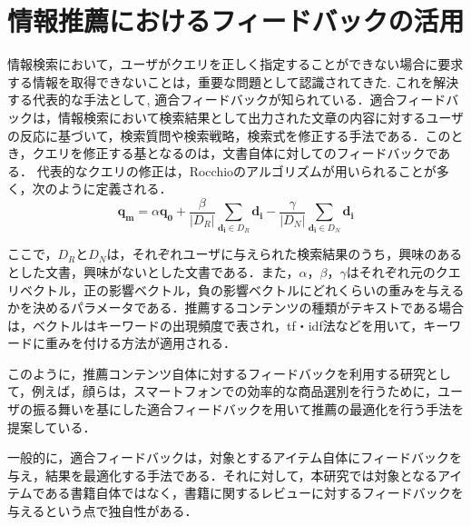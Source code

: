 \documentclass[a4paper,11pt,oneside,openany]{jsbook}
\begin{document}
	\section{情報推薦におけるフィードバックの活用}
\label{sec:related_feed}
情報検索において，ユーザがクエリを正しく指定することができない場合に要求する情報を取得できないことは，重要な問題として認識されてきた. これを解決する代表的な手法として, 適合フィードバックが知られている\cite{feedback}．適合フィードバックは，情報検索において検索結果として出力された文章の内容に対するユーザの反応に基づいて，検索質問や検索戦略，検索式を修正する手法である\cite{hijikata}．このとき，クエリを修正する基となるのは，文書自体に対してのフィードバックである．
代表的なクエリの修正は，Rocchioのアルゴリズムが用いられることが多く，次のように定義される．
\begin{equation}
\mathbf{q_m} = \alpha\mathbf{q_0}+\frac{\beta}{|D_R|}\sum_{\mathbf{d_i}\in{D_R}}{\mathbf{d_i}}-\frac{\gamma}{|D_N|}\sum_{\mathbf{d_i}\in{D_N}}{\mathbf{d_i}}
\end{equation}
\par
ここで，$D_R$と$D_N$は，それぞれユーザに与えられた検索結果のうち，興味のあるとした文書，興味がないとした文書である．また，$\alpha$，$\beta$，$\gamma$はそれぞれ元のクエリベクトル，正の影響ベクトル，負の影響ベクトルにどれくらいの重みを与えるかを決めるパラメータである．推薦するコンテンツの種類がテキストである場合は，ベクトルはキーワードの出現頻度で表され，tf・idf法などを用いて，キーワードに重みを付ける方法が適用される．
\par
このように，推薦コンテンツ自体に対するフィードバックを利用する研究として，例えば，顔らは，スマートフォンでの効率的な商品選別を行うために，ユーザの振る舞いを基にした適合フィードバックを用いて推薦の最適化を行う手法を提案している\cite{yan}．
\par
一般的に，適合フィードバックは，対象とするアイテム自体にフィードバックを与え，結果を最適化する手法である．それに対して，本研究では対象となるアイテムである書籍自体ではなく，書籍に関するレビューに対するフィードバックを与えるという点で独自性がある．
\end{document}
